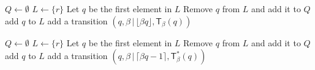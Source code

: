 \documentclass[12pt,reqno]{amsart}
\begin{document}
\begin{algorithm}   
 \begin{algorithmic}[1] 
            \State $Q\gets \emptyset$ 
            \State $L\gets \{r\}$ 
            \State Let $q$ be the first element in $L$
            \State Remove $q$ from $L$ and add it to $Q$
                 add $q$ to $L$ 
                \EndIf
                \State add a transition $(q,\beta\,|\,\lfloor \beta q\rfloor,\mathsf{T}_{\beta}(q))$ 
                \EndFor
            \EndWhile
        \EndProcedure
\end{algorithmic}
    \caption{Algorithm producing $\mathcal{T}_{E,r}$}
    \label{fig:algo-transducteur-glouton}
\end{algorithm}

\begin{algorithm}     
 \begin{algorithmic}[1] 
            \State $Q\gets \emptyset$ 
            \State $L\gets \{r\}$ 
            \State Let $q$ be the first element in $L$
            \State Remove $q$ from $L$ and add it to $Q$
                 add $q$ to $L$ 
                \EndIf
                \State add a transition $(q,\beta\,|\,\lceil \beta q-1\rceil,\mathsf{T}^*_{\beta}(q))$ 
                \EndFor
            \EndWhile
        \EndProcedure
\end{algorithmic}
    \caption{Algorithm producing $\mathcal{T}^*_{E,r}$}
    \label{fig:algo-transducteur-quasi-glouton}
\end{algorithm}
\end{document}
